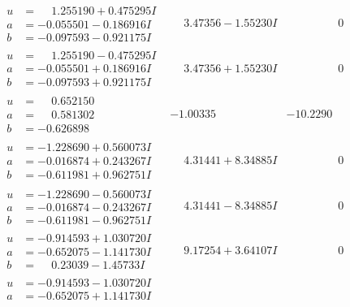 \documentclass[1p]{elsarticle_modified}
\theoremstyle{definition}
\begin{document}
$$\begin{array}{c|c|c}
 \hline 
\begin{aligned}
u &= \phantom{-}1.255190 + 0.475295 I \\
a &= -0.055501 - 0.186916 I \\
b &= -0.097593 - 0.921175 I\end{aligned}
 & \phantom{-}3.47356 - 1.55230 I & \phantom{-0.000000 } 0 \\ \hline\begin{aligned}
u &= \phantom{-}1.255190 - 0.475295 I \\
a &= -0.055501 + 0.186916 I \\
b &= -0.097593 + 0.921175 I\end{aligned}
 & \phantom{-}3.47356 + 1.55230 I & \phantom{-0.000000 } 0 \\ \hline\begin{aligned}
u &= \phantom{-}0.652150\phantom{ +0.000000I} \\
a &= \phantom{-}0.581302\phantom{ +0.000000I} \\
b &= -0.626898\phantom{ +0.000000I}\end{aligned}
 & -1.00335\phantom{ +0.000000I} & -10.2290\phantom{ +0.000000I} \\ \hline\begin{aligned}
u &= -1.228690 + 0.560073 I \\
a &= -0.016874 + 0.243267 I \\
b &= -0.611981 + 0.962751 I\end{aligned}
 & \phantom{-}4.31441 + 8.34885 I & \phantom{-0.000000 } 0 \\ \hline\begin{aligned}
u &= -1.228690 - 0.560073 I \\
a &= -0.016874 - 0.243267 I \\
b &= -0.611981 - 0.962751 I\end{aligned}
 & \phantom{-}4.31441 - 8.34885 I & \phantom{-0.000000 } 0 \\ \hline\begin{aligned}
u &= -0.914593 + 1.030720 I \\
a &= -0.652075 - 1.141730 I \\
b &= \phantom{-}0.23039 - 1.45733 I\end{aligned}
 & \phantom{-}9.17254 + 3.64107 I & \phantom{-0.000000 } 0 \\ \hline\begin{aligned}
u &= -0.914593 - 1.030720 I \\
a &= -0.652075 + 1.141730 I \\

\end{aligned}
\end{array}$$
\end{document}
